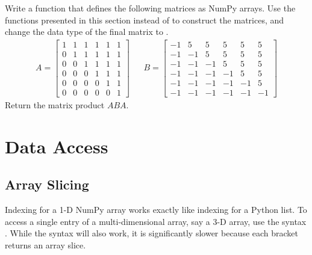 \begin{problem} %
Write a function that defines the following matrices as NumPy arrays.
Use the functions presented in this section instead of  to construct the matrices, and change the data type of the final matrix to .
\begin{align*}
A = \left[\begin{array}{rrrrrr}
1 & 1 & 1 & 1 & 1 & 1\\
0 & 1 & 1 & 1 & 1 & 1\\
0 & 0 & 1 & 1 & 1 & 1\\
0 & 0 & 0 & 1 & 1 & 1\\
0 & 0 & 0 & 0 & 1 & 1\\
0 & 0 & 0 & 0 & 0 & 1\end{array}\right]
&&
B = \left[\begin{array}{rrrrrr}
-1 &  5 &  5 &  5 &  5 &  5\\
-1 & -1 &  5 &  5 &  5 &  5\\
-1 & -1 & -1 &  5 &  5 &  5\\
-1 & -1 & -1 & -1 &  5 &  5\\
-1 & -1 & -1 & -1 & -1 &  5\\
-1 & -1 & -1 & -1 & -1 & -1\end{array}\right]
\end{align*}
Return the matrix product $ABA$.
\label{prob:simple3}
\end{problem}

\section*{Data Access} %

\subsection*{Array Slicing} %

Indexing for a 1-D NumPy array works exactly like indexing for a Python list. 
To access a single entry of a multi-dimensional array, say a 3-D array, use the syntax .
While the syntax  will also work, it is significantly slower because each bracket returns an array slice.

